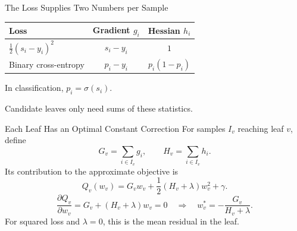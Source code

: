 \begin{frame}{The Loss Supplies Two Numbers per Sample}
  \centering
  \renewcommand{\arraystretch}{1.65}
  \begin{tabular}{lcc}
    \toprule
    Loss & Gradient $g_i$ & Hessian $h_i$\\ \midrule
    $\tfrac12(s_i-y_i)^2$ & $s_i-y_i$ & $1$\\
    Binary cross-entropy & $p_i-y_i$ & $p_i(1-p_i)$\\ \bottomrule
  \end{tabular}
  \vspace{.3cm}
  \par In classification, $p_i=\sigma(s_i)$.
  \pause
  \vspace{.5cm}
  \vspace{.35cm}
  \par Candidate leaves only need sums of these statistics.
\end{frame}

\begin{frame}{Each Leaf Has an Optimal Constant Correction}
  For samples $I_v$ reaching leaf $v$, define
  \[G_v=\sum_{i\in I_v}g_i,\qquad H_v=\sum_{i\in I_v}h_i.\]
  \pause
  Its contribution to the approximate objective is
  \[Q_v(w_v)=G_vw_v+\frac12(H_v+\lambda)w_v^2+\gamma.\]
  \pause
  \[\frac{\partial Q_v}{\partial w_v}=G_v+(H_v+\lambda)w_v=0
    \quad\Longrightarrow\quad
    \boxed{w_v^*=-\frac{G_v}{H_v+\lambda}}.\]
  \vspace{.2cm}
  \centering For squared loss and $\lambda=0$, this is the mean residual in the leaf.
\end{frame}

